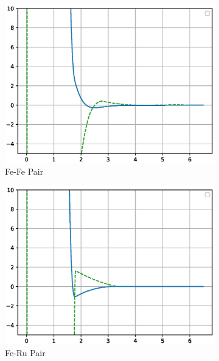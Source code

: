 \begin{figure}[htb]
\begin{subfigure}{.32\textwidth}
  \centering
  \includegraphics[width=.94\linewidth]{chapters/potentials_fe_pd_ru/feru_potential/function_plots/fefe_pair.eps}  
  \caption{Fe-Fe Pair}
  \label{fig:feru-fefe-pair}
\end{subfigure}
\begin{subfigure}{.32\textwidth}
  \centering
  \includegraphics[width=.94\linewidth]{chapters/potentials_fe_pd_ru/feru_potential/function_plots/feru_pair.eps}  
  \caption{Fe-Ru Pair}
  \label{fig:feru-feru-pair}
\end{subfigure}
\begin{subfigure}{.32\textwidth}
  \centering

\end{subfigure}
\end{figure}
